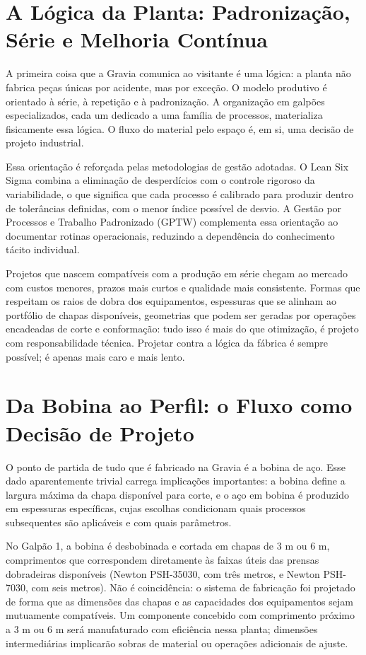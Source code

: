 \documentclass[12pt,a4paper,oneside,brazil,chapter=TITLE]{article}
\newcommand{\secbreak}{\clearpage}
\let\oldsection\section
\renewcommand{\section}{\secbreak\oldsection}
\begin{document}
\section{A Lógica da Planta: Padronização, Série e Melhoria Contínua}

A primeira coisa que a Gravia comunica ao visitante é uma lógica: a planta não fabrica peças únicas por acidente, mas por exceção. O modelo produtivo é orientado à série, à repetição e à padronização. A organização em galpões especializados, cada um dedicado a uma família de processos, materializa fisicamente essa lógica. O fluxo do material pelo espaço é, em si, uma decisão de projeto industrial.

Essa orientação é reforçada pelas metodologias de gestão adotadas. O Lean Six Sigma combina a eliminação de desperdícios com o controle rigoroso da variabilidade, o que significa que cada processo é calibrado para produzir dentro de tolerâncias definidas, com o menor índice possível de desvio. A Gestão por Processos e Trabalho Padronizado (GPTW) complementa essa orientação ao documentar rotinas operacionais, reduzindo a dependência do conhecimento tácito individual.

Projetos que nascem compatíveis com a produção em série chegam ao mercado com custos menores, prazos mais curtos e qualidade mais consistente. Formas que respeitam os raios de dobra dos equipamentos, espessuras que se alinham ao portfólio de chapas disponíveis, geometrias que podem ser geradas por operações encadeadas de corte e conformação: tudo isso é mais do que otimização, é projeto com responsabilidade técnica. Projetar contra a lógica da fábrica é sempre possível; é apenas mais caro e mais lento.

\section{Da Bobina ao Perfil: o Fluxo como Decisão de Projeto}

O ponto de partida de tudo que é fabricado na Gravia é a bobina de aço. Esse dado aparentemente trivial carrega implicações importantes: a bobina define a largura máxima da chapa disponível para corte, e o aço em bobina é produzido em espessuras específicas, cujas escolhas condicionam quais processos subsequentes são aplicáveis e com quais parâmetros.

No Galpão 1, a bobina é desbobinada e cortada em chapas de 3 m ou 6 m, comprimentos que correspondem diretamente às faixas úteis das prensas dobradeiras disponíveis (Newton PSH-35030, com três metros, e Newton PSH-7030, com seis metros). Não é coincidência: o sistema de fabricação foi projetado de forma que as dimensões das chapas e as capacidades dos equipamentos sejam mutuamente compatíveis. Um componente concebido com comprimento próximo a 3 m ou 6 m será manufaturado com eficiência nessa planta; dimensões intermediárias implicarão sobras de material ou operações adicionais de ajuste.
\end{document}
